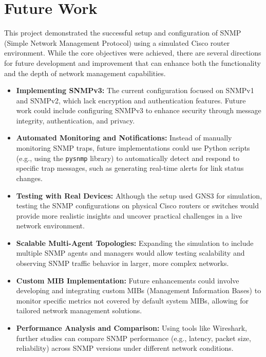 \chapter{Future Work}
\label{chap:todo}

This project demonstrated the successful setup and configuration of SNMP (Simple Network Management Protocol) using a simulated Cisco router environment. While the core objectives were achieved, there are several directions for future development and improvement that can enhance both the functionality and the depth of network management capabilities.

\begin{itemize}
    \item \textbf{Implementing SNMPv3:} The current configuration focused on SNMPv1 and SNMPv2, which lack encryption and authentication features. Future work could include configuring SNMPv3 to enhance security through message integrity, authentication, and privacy.

    \item \textbf{Automated Monitoring and Notifications:} Instead of manually monitoring SNMP traps, future implementations could use Python scripts (e.g., using the \texttt{pysnmp} library) to automatically detect and respond to specific trap messages, such as generating real-time alerts for link status changes.

    \item \textbf{Testing with Real Devices:} Although the setup used GNS3 for simulation, testing the SNMP configurations on physical Cisco routers or switches would provide more realistic insights and uncover practical challenges in a live network environment.

    \item \textbf{Scalable Multi-Agent Topologies:} Expanding the simulation to include multiple SNMP agents and managers would allow testing scalability and observing SNMP traffic behavior in larger, more complex networks.

    \item \textbf{Custom MIB Implementation:} Future enhancements could involve developing and integrating custom MIBs (Management Information Bases) to monitor specific metrics not covered by default system MIBs, allowing for tailored network management solutions.

    \item \textbf{Performance Analysis and Comparison:} Using tools like Wireshark, further studies can compare SNMP performance (e.g., latency, packet size, reliability) across SNMP versions under different network conditions.



\end{itemize}


